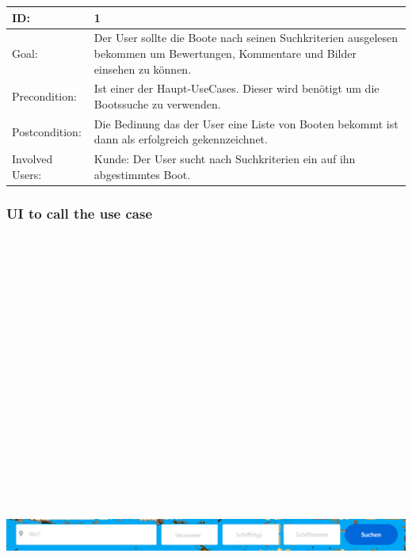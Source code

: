 \documentclass[12pt]{article}
\theoremstyle{definition}
\begin{document}
\begin{tabular}{|p{.2\linewidth}|p{.65\linewidth}|}
\hline 
ID: & 1 \\ \hline
Goal: & Der User sollte die Boote nach seinen Suchkriterien ausgelesen bekommen um Bewertungen, Kommentare und Bilder einsehen zu können. \\ \hline
Precondition: & Ist einer der Haupt-UseCases. Dieser wird benötigt um die Bootssuche zu verwenden. \\ \hline
Postcondition: & Die Bedinung das der User eine Liste von Booten bekommt ist dann als erfolgreich gekennzeichnet. \\ \hline
Involved Users: &Kunde: Der User sucht nach Suchkriterien ein auf ihn abgestimmtes Boot. \\ \hline
\end{tabular}

\subsubsection{UI to call the use case}
\begin{center}\includegraphics[width=15cm,height=20cm,keepaspectratio]{Startseite2.png}\end{center}
\end{document}
